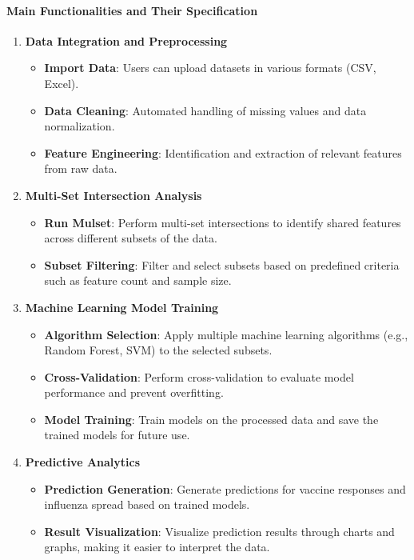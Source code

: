 \documentclass[runningheads,a4paper,11pt]{report}
\begin{document}
\paragraph{Main Functionalities and Their Specification}

\begin{enumerate}
    \item \textbf{Data Integration and Preprocessing}
    \begin{itemize}
        \item \textbf{Import Data}: Users can upload datasets in various formats (CSV, Excel).
        \item \textbf{Data Cleaning}: Automated handling of missing values and data normalization.
        \item \textbf{Feature Engineering}: Identification and extraction of relevant features from raw data.
    \end{itemize}
    \item \textbf{Multi-Set Intersection Analysis}
    \begin{itemize}
        \item \textbf{Run Mulset}: Perform multi-set intersections to identify shared features across different subsets of the data.
        \item \textbf{Subset Filtering}: Filter and select subsets based on predefined criteria such as feature count and sample size.
    \end{itemize}
    \item \textbf{Machine Learning Model Training}
    \begin{itemize}
        \item \textbf{Algorithm Selection}: Apply multiple machine learning algorithms (e.g., Random Forest, SVM) to the selected subsets.
        \item \textbf{Cross-Validation}: Perform cross-validation to evaluate model performance and prevent overfitting.
        \item \textbf{Model Training}: Train models on the processed data and save the trained models for future use.
    \end{itemize}
    \item \textbf{Predictive Analytics}
    \begin{itemize}
        \item \textbf{Prediction Generation}: Generate predictions for vaccine responses and influenza spread based on trained models.
        \item \textbf{Result Visualization}: Visualize prediction results through charts and graphs, making it easier to interpret the data.

\end{itemize}
\end{enumerate}
\end{document}
